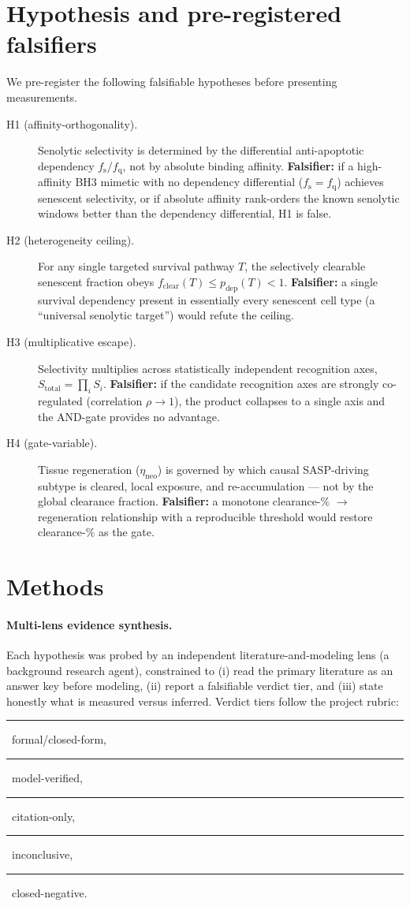 \documentclass[11pt,a4paper]{article}
\newcommand{\tierdisc}[1]{\textcolor{#1}{\rule[0.05ex]{1.0ex}{1.0ex}}}
\newcommand{\tierBlue}{\tierdisc{blue!70!black}}
\newcommand{\tierGreen}{\tierdisc{green!60!black}}
\newcommand{\tierYellow}{\tierdisc{yellow!85!black}}
\newcommand{\tierOrange}{\tierdisc{orange!90!black}}
\newcommand{\tierRed}{\tierdisc{red!80!black}}
\newcommand{\fs}{f_{\mathrm{s}}}
\newcommand{\fq}{f_{\mathrm{q}}}
\newcommand{\Stot}{S_{\mathrm{total}}}
\newcommand{\fclear}{f_{\mathrm{clear}}}
\newcommand{\pdep}{p_{\mathrm{dep}}}
\begin{document}
\section{Hypothesis and pre-registered falsifiers}
\label{sec:hypothesis}

We pre-register the following falsifiable hypotheses before presenting
measurements.

\begin{description}
\item[H1 (affinity-orthogonality).] Senolytic selectivity is determined by the
  differential anti-apoptotic dependency $\fs/\fq$, not by absolute binding
  affinity. \textbf{Falsifier:} if a high-affinity BH3 mimetic with no
  dependency differential ($\fs=\fq$) achieves senescent selectivity, or if
  absolute affinity rank-orders the known senolytic windows better than the
  dependency differential, H1 is false.
\item[H2 (heterogeneity ceiling).] For any single targeted survival pathway
  $T$, the selectively clearable senescent fraction obeys
  $\fclear(T)\le\pdep(T)<1$. \textbf{Falsifier:} a single survival dependency
  present in essentially every senescent cell type (a ``universal senolytic
  target'') would refute the ceiling.
\item[H3 (multiplicative escape).] Selectivity multiplies across statistically
  independent recognition axes, $\Stot=\prod_i S_i$. \textbf{Falsifier:} if the
  candidate recognition axes are strongly co-regulated (correlation
  $\rho\to1$), the product collapses to a single axis and the AND-gate provides
  no advantage.
\item[H4 (gate-variable).] Tissue regeneration ($\eta_{\mathrm{neo}}$) is
  governed by which causal SASP-driving subtype is cleared, local exposure, and
  re-accumulation --- not by the global clearance fraction. \textbf{Falsifier:}
  a monotone clearance-\% $\to$ regeneration relationship with a reproducible
  threshold would restore clearance-\% as the gate.
\end{description}

\section{Methods}
\label{sec:methods}

\paragraph{Multi-lens evidence synthesis.}
Each hypothesis was probed by an independent literature-and-modeling lens
(a background research agent), constrained to (i) read the primary literature
as an answer key before modeling, (ii) report a falsifiable verdict tier, and
(iii) state honestly what is measured versus inferred. Verdict tiers follow the
project rubric: \tierBlue{}~formal/closed-form, \tierGreen{}~model-verified,
\tierYellow{}~citation-only, \tierOrange{}~inconclusive, \tierRed{}~closed-negative.
\end{document}
